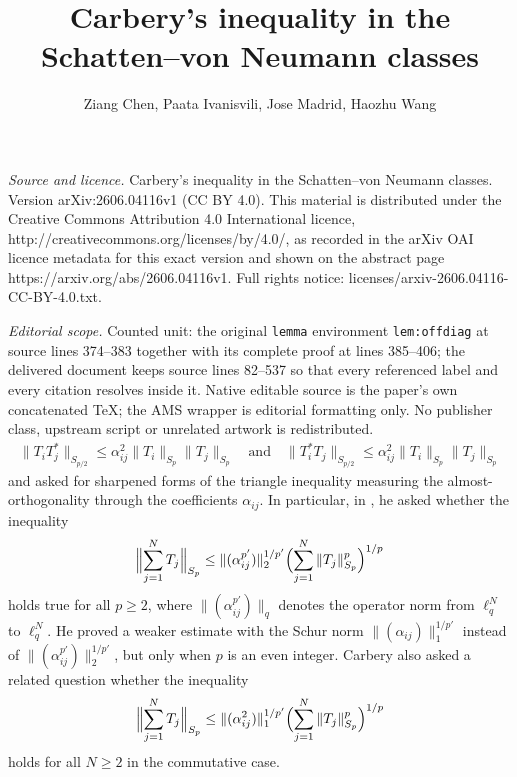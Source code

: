 \documentclass[10pt,a4paper]{amsart}
\newcommand{\1}{\mathbf{1}}
\begin{document}
\title[Carbery's inequality in the Schatten--von Neumann classes]{Carbery's inequality in the Schatten--von Neumann classes}
\author{Ziang Chen, Paata Ivanisvili, Jose Madrid, Haozhu Wang}
\date{}
\maketitle
\noindent\emph{Source and licence.} Carbery's inequality in the Schatten--von Neumann classes. Version arXiv:2606.04116v1 (CC BY 4.0). This material is distributed under the Creative Commons Attribution 4.0 International licence, http://creativecommons.org/licenses/by/4.0/, as recorded in the arXiv OAI licence metadata for this exact version and shown on the abstract page https://arxiv.org/abs/2606.04116v1. Full rights notice: licenses/arxiv-2606.04116-CC-BY-4.0.txt.\par\smallskip
\noindent\textit{Editorial scope.} Counted unit: the original \texttt{lemma} environment \texttt{lem:offdiag} at source lines 374--383 together with its complete proof at lines 385--406; the delivered document keeps source lines 82--537 so that every referenced label and every citation resolves inside it. Native editable source is the paper's own concatenated TeX; the AMS wrapper is editorial formatting only. No publisher class, upstream script or unrelated artwork is redistributed.
\begin{align}\label{carbp}
\|T_i T^{*}_j\|_{S_{p/2}} \leq \alpha_{ij}^{2} \|T_i\|_{S_p}\|T_j\|_{S_p} \quad \text{and} \quad \|T^{*}_i T_j\|_{S_{p/2}} \leq \alpha_{ij}^{2} \|T_i\|_{S_p}\|T_j\|_{S_p}
\end{align}
and asked for sharpened forms of the triangle inequality measuring the almost-orthogonality through the coefficients $\alpha_{ij}$. In particular, in \cite[Section~3.3, (3.1)]{Carbery2009}, he asked whether the inequality
\begin{align}\label{enisori}
\Bigl\|\sum_{j=1}^N T_j\Bigr\|_{S_p}
\leq
\|(\alpha_{ij}^{p'})\|_{2}^{1/p'}
\Bigl(\sum_{j=1}^N\|T_j\|_{S_p}^p\Bigr)^{1/p}
\end{align}
holds true for all $p\geq 2$, where $\| (\alpha_{ij}^{p'})\|_{q}$ denotes the operator norm from $\ell_{q}^{N}$ to $\ell_{q}^{N}$. He proved \cite[Theorem~1.3]{Carbery2009} a weaker estimate with the Schur norm $\|(\alpha_{ij})\|_{1}^{1/p'}$ instead of  $\|(\alpha_{ij}^{p'})\|_{2}^{1/p'}$, but only when $p$ is an even integer. Carbery also asked a related question \cite[Section~3.5]{Carbery2009} whether the inequality 
\begin{align}\label{oripower}
\Bigl\|\sum_{j=1}^N T_j\Bigr\|_{S_p}
\leq
\|(\alpha_{ij}^{2})\|_{1}^{1/p'}
\Bigl(\sum_{j=1}^N\|T_j\|_{S_p}^p\Bigr)^{1/p}
\end{align}
holds for all $N\geq 2$ in the commutative case. 
\end{document}
